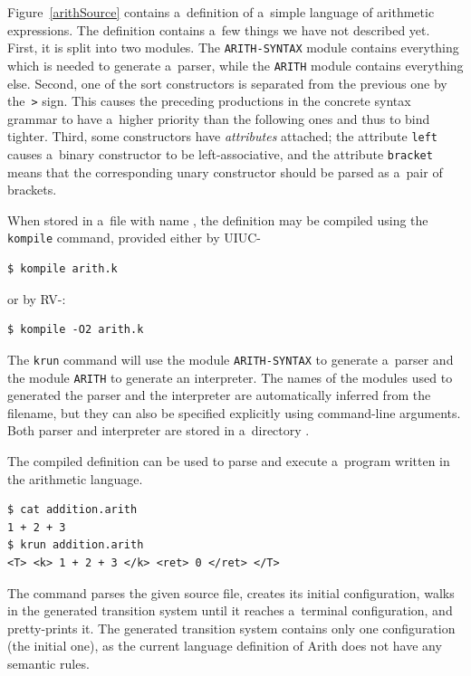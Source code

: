 \documentclass[nolot,nolof,nocover,printed]{fithesis3}
\newcommand{\krun}{\texttt{krun}\xspace}
\newcommand{\kompile}{\texttt{kompile}\xspace}
\begin{document}
Figure~\ref{arithSource} contains a~definition of a~simple language of arithmetic expressions. The definition contains a~few things we have not described yet. First, it is split into two modules. The \lstinline|ARITH-SYNTAX| module contains everything which is needed to generate a~parser, while the \lstinline|ARITH| module contains everything else. Second, one of the sort constructors is separated from the previous one by the~\lstinline|>| sign. This causes the preceding productions in the concrete syntax grammar to have a~higher priority than the following ones and thus to bind tighter. Third, some constructors have \textit{attributes} attached; the attribute \lstinline|left| causes a~binary constructor to be left-associative, and the attribute \lstinline|bracket| means that the corresponding unary constructor should be parsed as a~pair of brackets.

When stored in a~file with name , the definition may be compiled using the \kompile command, provided either by UIUC-\K
\begin{lstlisting}
$ kompile arith.k
\end{lstlisting}
or by RV-\K:
\begin{lstlisting}
$ kompile -O2 arith.k
\end{lstlisting}
The \krun command will use the module \lstinline|ARITH-SYNTAX| to generate a~parser and the module \lstinline|ARITH| to generate an interpreter. The names of the modules used to generated the parser and the interpreter are automatically inferred from the filename, but they can also be specified explicitly using command-line arguments. Both parser and interpreter are stored in a~directory .

The compiled definition can be used to parse and execute a~program written in the arithmetic language.
\begin{lstlisting}
$ cat addition.arith
1 + 2 + 3
$ krun addition.arith
<T> <k> 1 + 2 + 3 </k> <ret> 0 </ret> </T>
\end{lstlisting}
The command parses the given source file, creates its initial configuration, walks in the generated transition system until it reaches a~terminal configuration, and pretty-prints it. The generated transition system contains only one configuration (the initial one), as the current language definition of Arith does not have any semantic rules.
\end{document}
